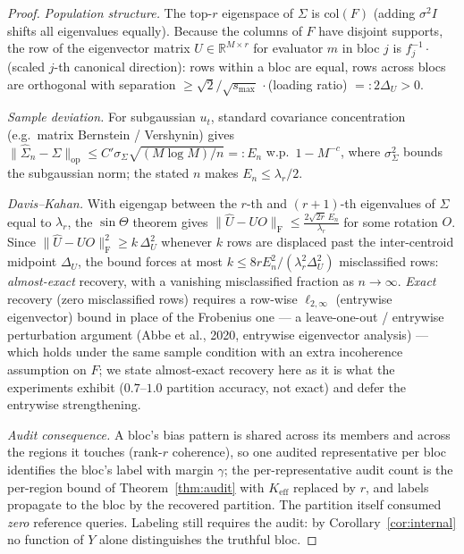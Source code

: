 \documentclass[11pt]{article}
\theoremstyle{definition}\newtheorem{definition}{Definition}
\theoremstyle{definition}\newtheorem{assumption}{Assumption}
\begin{document}
\begin{proof}
\emph{Population structure.} The top-$r$ eigenspace of $\Sigma$ is
$\mathrm{col}(F)$ (adding $\sigma^2 I$ shifts all eigenvalues equally). Because
the columns of $F$ have disjoint supports, the row of the eigenvector matrix
$U\in\mathbb{R}^{M\times r}$ for evaluator $m$ in bloc $j$ is
$f_j^{-1}\cdot$(scaled $j$-th canonical direction): rows within a bloc are equal,
rows across blocs are orthogonal with separation
$\ge \sqrt{2}/\sqrt{s_{\max}}\,\cdot$(loading ratio) $=:2\Delta_U>0$.

\emph{Sample deviation.} For subgaussian $u_t$, standard covariance concentration
(e.g.\ matrix Bernstein / Vershynin) gives
$\|\hat\Sigma_n-\Sigma\|_{\mathrm{op}}\le
C'\sigma_{\Sigma}\sqrt{(M\log M)/n}=:E_n$ w.p.\ $1-M^{-c}$, where
$\sigma_\Sigma^2$ bounds the subgaussian norm; the stated $n$ makes
$E_n\le\lambda_r/2$.

\emph{Davis--Kahan.} With eigengap between the $r$-th and $(r{+}1)$-th
eigenvalues of $\Sigma$ equal to $\lambda_r$, the $\sin\Theta$ theorem gives
$\|\hat U-U O\|_{\mathrm{F}}\le \frac{2\sqrt{2r}\,E_n}{\lambda_r}$ for some
rotation $O$. Since $\|\hat U-UO\|_{\mathrm F}^2\ge k\,\Delta_U^2$ whenever $k$ rows
are displaced past the inter-centroid midpoint $\Delta_U$, the bound forces at most
$k\le 8rE_n^2/(\lambda_r^2\Delta_U^2)$ misclassified rows: \emph{almost-exact}
recovery, with a vanishing misclassified fraction as $n\!\to\!\infty$.
\emph{Exact} recovery (zero misclassified rows) requires a row-wise
$\ell_{2,\infty}$ (entrywise eigenvector) bound in place of the Frobenius one --- a
leave-one-out / entrywise perturbation argument (Abbe et al., 2020, entrywise
eigenvector analysis) --- which holds under the same sample condition with an
extra incoherence assumption on $F$; we state almost-exact recovery here as it is
what the experiments exhibit ($0.7$--$1.0$ partition accuracy, not exact) and defer
the entrywise strengthening.

\emph{Audit consequence.} A bloc's bias pattern is shared across its members and
across the regions it touches (rank-$r$ coherence), so one audited representative
per bloc identifies the bloc's label with margin $\gamma$; the per-representative
audit count is the per-region bound of Theorem~\ref{thm:audit} with
$K_{\mathrm{eff}}$ replaced by $r$, and labels propagate to the bloc by the
recovered partition. The partition itself consumed \emph{zero} reference queries.
Labeling still requires the audit: by Corollary~\ref{cor:internal} no function of
$Y$ alone distinguishes the truthful bloc.
\end{proof}
\end{document}
